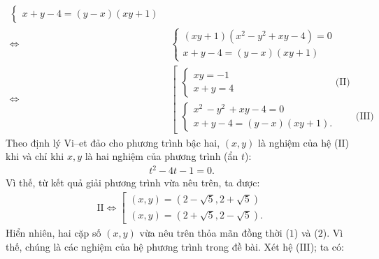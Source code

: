 \begin{multicols}{2}
{{\begin{align*}
\begin{cases}
		x + y - 4 = \left( {y - x} \right)\left( {xy + 1} \right)
	\end{cases}\\
	\Leftrightarrow & \begin{cases}
		\left( {xy + 1} \right)\left( {{x^2} - {y^2} + xy - 4} \right) = 0\\
		x + y - 4 = \left( {y - x} \right)\left( {xy + 1} \right)
	\end{cases}\\
	\Leftrightarrow & \left[\begin{array}{l}
		\begin{cases}
			xy =  - 1\\
			x + y = 4
		\end{cases} \quad\quad\quad\quad\quad\quad\quad\quad\quad\quad\!\!\text{(II)}\\
		\begin{cases}
			{x^2}\, - {y^2}\, + xy - 4 = 0\\
			x + y - 4 = \left( {y - x} \right)\left( {xy + 1} \right).
		\end{cases}	\quad\quad\text{(III)}
	\end{array} \right.
	\end{align*}}}
	\vskip 0.05cm
	Theo định lý Vi--et đảo cho phương trình bậc hai, $(x, y)$ là nghiệm của hệ ($\text{II}$) khi và chỉ khi $x, y$ là hai nghiệm của phương trình (ẩn $t$):
	\begin{align*}
		t^2 - 4t - 1 = 0.
	\end{align*}
	Vì thế, từ kết quả giải phương trình vừa nêu trên, ta được:
	\begin{align*}
		\text{II} \Leftrightarrow \left[ \begin{array}{l}
			\left( {x,y} \right) = \left( {2 - \sqrt 5 ,2 + \sqrt 5 } \right)\\
			\left( {x,y} \right) = \left( {2 + \sqrt 5 ,2 - \sqrt 5 } \right).
		\end{array} \right.
	\end{align*}  
	Hiển nhiên, hai cặp số $(x, y)$ vừa nêu trên thỏa mãn đồng thời ($1$) và ($2$). Vì thế, chúng là các nghiệm của hệ phương trình trong đề bài.
	\vskip 0.05cm
	Xét hệ ($\text{III}$); ta có:
	\vskip 0.05cm
\end{multicols}
